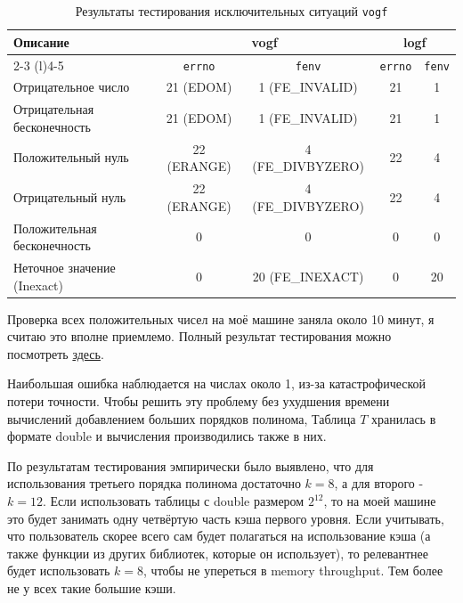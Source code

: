\documentclass[12pt]{extarticle}
\begin{document}
\begin{table}[h!]
\centering
\label{tab:flags_results}
\begin{tabular}{lcccc}
\toprule
\textbf{Описание} & \multicolumn{2}{c}{\textbf{vogf}} & \multicolumn{2}{c}{\textbf{logf}} \\
\cmidrule(r){2-3} \cmidrule(l){4-5}
& \texttt{errno} & \texttt{fenv} & \texttt{errno} & \texttt{fenv} \\
\midrule
Отрицательное число & 21 (EDOM) & 1 (FE\_INVALID) & 21 & 1 \\
Отрицательная бесконечность & 21 (EDOM) & 1 (FE\_INVALID) & 21 & 1 \\
Положительный нуль & 22 (ERANGE) & 4 (FE\_DIVBYZERO) & 22 & 4 \\
Отрицательный нуль & 22 (ERANGE) & 4 (FE\_DIVBYZERO) & 22 & 4 \\
Положительная бесконечность & 0 & 0 & 0 & 0 \\
Неточное значение (Inexact) & 0 & 20 (FE\_INEXACT) & 0 & 20 \\
\bottomrule
\end{tabular}
\caption{Результаты тестирования исключительных ситуаций \texttt{vogf}}
\end{table}

Проверка всех положительных чисел на моё машине заняла около 10 минут, я считаю это вполне приемлемо. Полный результат тестирования можно посмотреть \href{https://github.com/kzueirf12345/numerical/blob/Task7/7/assets/testing.txt}{здесь}.

Наибольшая ошибка наблюдается на числах около 1, из-за катастрофической потери точности. Чтобы решить эту проблему без ухудшения времени вычислений добавлением больших порядков полинома, Таблица $T$ хранилась в формате double и вычисления производились также в них.

По результатам тестирования эмпирически было выявлено, что для использования третьего порядка полинома достаточно $k=8$, а для второго - $k=12$. Если использовать таблицы с double размером $2^{12}$, то на моей машине это будет занимать одну четвёртую часть кэша первого уровня. Если учитывать, что пользователь скорее всего сам будет полагаться на использование кэша (а также функции из других библиотек, которые он использует), то релевантнее будет использовать $k=8$, чтобы не упереться в memory throughput. Тем более не у всех такие большие кэши.
\end{document}
